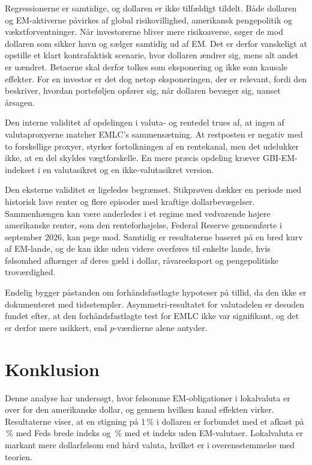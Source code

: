 \documentclass[11pt,a4paper]{article}
\begin{document}
Regressionerne er samtidige, og dollaren er ikke tilfældigt tildelt. Både dollaren og EM-aktiverne påvirkes af global risikovillighed, amerikansk pengepolitik og vækstforventninger. Når investorerne bliver mere risikoaverse, søger de mod dollaren som sikker havn og sælger samtidig ud af EM. Det er derfor vanskeligt at opstille et klart kontrafaktisk scenarie, hvor dollaren ændrer sig, mens alt andet er uændret. Betaerne skal derfor tolkes som eksponering og ikke som kausale effekter. For en investor er det dog netop eksponeringen, der er relevant, fordi den beskriver, hvordan porteføljen opfører sig, når dollaren bevæger sig, uanset årsagen.

Den interne validitet af opdelingen i valuta- og rentedel trues af, at ingen af valutaproxyerne matcher EMLC's sammensætning. At restposten er negativ med to forskellige proxyer, styrker fortolkningen af en rentekanal, men det udelukker ikke, at en del skyldes vægtforskelle. En mere præcis opdeling kræver GBI-EM-indekset i en valutasikret og en ikke-valutasikret version.

Den eksterne validitet er ligeledes begrænset. Stikprøven dækker en periode med historisk lave renter og flere episoder med kraftige dollarbevægelser. Sammenhængen kan være anderledes i et regime med vedvarende højere amerikanske renter, som den renteforhøjelse, Federal Reserve gennemførte i september 2026, kan pege mod. Samtidig er resultaterne baseret på en bred kurv af EM-lande, og de kan ikke uden videre overføres til enkelte lande, hvis følsomhed afhænger af deres gæld i dollar, råvareeksport og pengepolitiske troværdighed.

Endelig bygger påstanden om forhåndsfastlagte hypoteser på tillid, da den ikke er dokumenteret med tidsstempler. Asymmetri-resultatet for valutadelen er desuden fundet efter, at den forhåndsfastlagte test for EMLC ikke var signifikant, og det er derfor mere usikkert, end $p$-værdierne alene antyder.

\section{Konklusion}

Denne analyse har undersøgt, hvor følsomme EM-obligationer i lokalvaluta er over for den amerikanske dollar, og gennem hvilken kanal effekten virker. Resultaterne viser, at en stigning på 1\,\% i dollaren er forbundet med et afkast på \BetaEMLC\,\% med Feds brede indeks og \AfeEMLC\,\% med et indeks uden EM-valutaer. Lokalvaluta er markant mere dollarfølsom end hård valuta, hvilket er i overensstemmelse med teorien.
\end{document}
